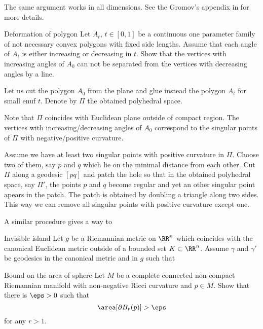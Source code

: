 The same argument works in all dimensions.
See the Gromov's appendix in \cite{gromov-apendix} for more details.












\begin{pr}{}{Deformation of polygon}\label{Deformation of polygon}
Let $A_t$, $t\in [0,1]$ be a continuous one parameter family of not necessary convex polygons with fixed side lengths.
Assume that each angle of $A_t$ is either increasing or decreasing in $t$.
Show that the vertices with increasing angles of $A_0$
can not be separated from the vertices with decreasing angles by a line.
\end{pr}


Let us cut the polygon $A_0$ from the plane and glue instead the polygon $A_t$ for small enuf $t$.
Denote by $\Pi$ the obtained polyhedral space.

Note that 
$\Pi$ coincides with Euclidean plane outside of compact region.
The vertices with increasing/decreasing angles of $A_0$ 
correspond to the singular points of $\Pi$ with negative/positive curvature.

Assume we have at least two singular points with positive curvature in $\Pi$.
Choose two of them, 
say $p$ and $q$ which lie on the minimal distance from each other. 
Cut $\Pi$ along a geodesic $[pq]$
and patch the hole 
so that in the obtained polyhedral space, say $\Pi'$, 
the points $p$ and $q$ become regular and yet an other singular point apears in the patch. 
The patch is obtained by doubling a triangle along  two sides.
This way we can remove all singular points with positive curvature except one.

A similar procedure gives a way to 










\begin{pr}{}{Invisible island}
Let $g$ be a Riemannian metric on $\RR^n$ which coincides with the canonical Euclidean metric outside of a bounded set $K\subset \RR^n$.
Assume $\gamma$ and $\gamma'$ be geodesics in the canonical metric and in $g$
such that
\end{pr}





\begin{pr}{}{Bound on the area of sphere}
Let $M$ be a complete connected non-compact Riemannian manifold with non-negative Ricci curvature and $p\in M$.
Show that there is $\eps>0$ such that
$$\area [\partial B_r(p)]>\eps$$
for any $r>1$.
\end{pr}










